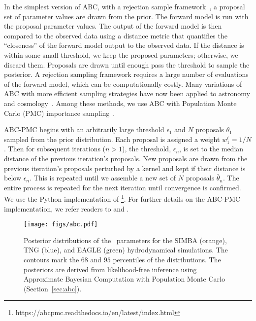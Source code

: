 In the simplest version of ABC, with a rejection sample
framework~\citep{pritchard1999}, a proposal set of parameter values are drawn
from the prior. The forward model is run with the proposal parameter values.
The output of the forward model is then compared to the observed data using
a distance metric that quantifies the ``closeness'' of the forward model
output to the observed data. 
If the distance is within some small threshold, we keep the proposed
parameters; otherwise, we discard them.  Proposals are
drawn until enough pass the threshold to sample the posterior. A
rejection sampling framework requires a large number of evaluations of the
forward model, which
can be computationally costly. Many variations of ABC with more efficient
sampling strategies have now been applied to astronomy and
cosmology~\citep[\eg][]{cameron2012, weyant2013, ishida2015, lin2016, alsing2018}.
Among these methods, we use ABC with Population Monte Carlo (PMC) 
importance sampling~\citep{hahn2017a, hahn2017b, hahn2019a}.

ABC-PMC begins with an arbitrarily large threshold $\epsilon_1$ and $N$ proposals 
$\bar{\theta}_1$ sampled from the prior distribution. Each proposal is
assigned a weight $w^i_1 = 1/N$. Then for subsequent iterations ($n > 1$), the 
threshold, $\epsilon_n$, is set to the median distance of the previous iteration's
proposals. New proposals are drawn from the previous iteration's proposals perturbed 
by a kernel and kept if their distance is below $\epsilon_n$. This is repeated
until we assemble a new set of $N$ proposals $\bar{\theta}_n$. The entire
process is repeated for the next iteration until convergence is confirmed. 
We use the Python implementation of
\cite{akeret2015}\footnote{https://abcpmc.readthedocs.io/en/latest/index.html}.
For further details on the ABC-PMC implementation, we refer readers to \cite{hahn2017b}
and \cite{hahn2019a}.

\begin{figure}
\begin{center}
    \texttt{[image: figs/abc.pdf]}
    \caption{\label{fig:abc}
    Posterior distributions of the \eda~parameters for the SIMBA (orange), TNG
    (blue), and EAGLE (green) hydrodynamical simulations. The contours mark the $68$
    and $95$ percentiles of the distributions. The posteriors are derived from 
    likelihood-free inference using Approximate Bayesian Computation with
    Population Monte Carlo (Section~\ref{sec:abc}). 
    }
\end{center}
\end{figure}

